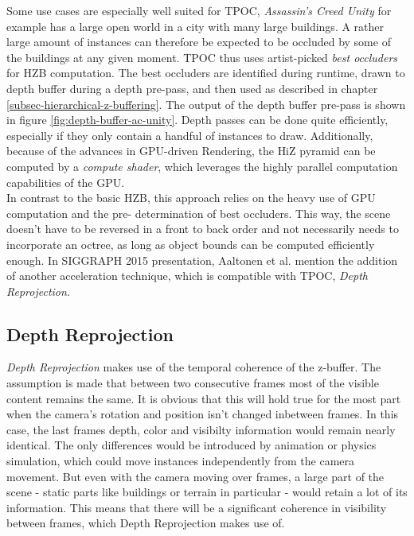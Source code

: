 \noindent
Some use cases are especially well suited for \ac{TPOC}, \emph{Assassin's Creed Unity} for example has a large open 
world in a city with many large buildings. A rather large amount of instances can therefore be expected to be occluded 
by some of the buildings at any given moment. \ac{TPOC} thus uses artist-picked \emph{best occluders} for \ac{HZB} 
computation. The best occluders are identified during runtime, drawn to depth buffer during a depth pre-pass, and 
then used as described in chapter \ref{subsec-hierarchical-z-buffering}. The output of the depth buffer pre-pass is 
shown in figure \ref{fig:depth-buffer-ac-unity}. Depth passes can be done quite efficiently, especially if they 
only contain a handful of instances to draw. Additionally, because of the advances in \ac{GPU}-driven Rendering, the 
\ac{HiZ} pyramid can be computed by a \emph{compute shader}, which leverages the highly parallel computation 
capabilities of the \ac{GPU}. \\

\noindent
In contrast to the basic \ac{HZB}, this approach relies on the heavy use of \ac{GPU} computation and the pre-
determination of best occluders. This way, the scene doesn't have to be reversed in a front to back order and 
not necessarily needs to incorporate an octree, as long as object bounds can be computed efficiently enough.
In SIGGRAPH 2015 presentation, Aaltonen et al. \cite{Aaltonen2015} mention the addition of another acceleration 
technique, which is compatible with \ac{TPOC}, \emph{Depth Reprojection}.


\subsection{Depth Reprojection} \label{subsec-depth-reprojection}

\emph{Depth Reprojection} makes use of the temporal coherence of the z-buffer. The assumption is made that 
between two consecutive frames most of the visible content remains the same. It is obvious that this will 
hold true for the most part when the camera's rotation and position isn't changed inbetween frames. In this case, 
the last frames depth, color and visibilty information would remain nearly identical. The only differences would 
be introduced by animation or physics simulation, which could move instances independently from the camera movement.
But even with the camera moving over frames, a large part of the scene - static parts like buildings or terrain in 
particular - would retain a lot of its information. This means that there will be a significant coherence in 
visibility between frames, which Depth Reprojection makes use of.\\

